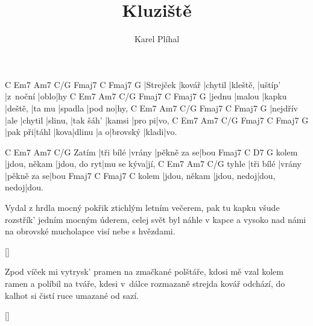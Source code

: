 \documentclass{song}
\author{Karel Plíhal}
\title{Kluziště}
\begin{document}
\strophe
C         Em7    Am7     C/G      Fmaj7  C        Fmaj7 G
|Strejček |kovář |chytil |kleště, |uštíp' |z~noční |oblo|hy
C      Em7    Am7   C/G      Fmaj7 C        Fmaj7 G
|jednu |malou |kapku |deště, |ta mu |spadla |pod no|hy,
C        Em7  Am7     C/G     Fmaj7     C      Fmaj7  G
|nejdřív |ale |chytil |slinu, |tak šáh' |kamsi |pro pi|vo,
C       Em7   Am7  C/G    Fmaj7 C      Fmaj7 G
|pak při|táhl |kova|dlinu |a o|brovský |kladi|vo.
\endstrophe

      C         Em7    Am7        C/G
Zatím |tři bílé |vrány |pěkně za se|bou
      Fmaj7        C            D7        G
kolem |jdou, někam |jdou, do ryt|mu se kýva|jí,
      C         Em7    Am7         C/G
tyhle |tři bílé |vrány |pěkně za se|bou
      Fmaj7        C           Fmaj7      C
kolem |jdou, někam |jdou, nedoj|dou, nedoj|dou.
\endstrophe

\strophe*
Vydal z hrdla mocný pokřik ztichlým letním večerem,
pak tu kapku všude rozstřík' jedním mocným úderem,
celej svět byl náhle v kapce a vysoko nad námi
na obrovské mucholapce visí nebe s hvězdami.
\endstrophe

\ref{}

\strophe*
Zpod víček mi vytrysk' pramen na zmačkané polštáře,
kdosi mě vzal kolem ramen a políbil na tváře,
kdesi v~dálce rozmazaně strejda kovář odchází,
do kalhot si čistí ruce umazané od sazí.
\endstrophe

\ref{}
\end{document}
